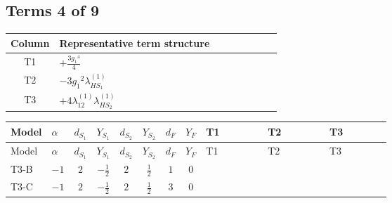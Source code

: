 \documentclass[8pt]{article}
\begin{document}
\begin{landscape}
\subsection*{Terms 4 of 9}
\begin{center}
\begin{tabular}{@{}c >{\raggedright\arraybackslash}p{0.82\linewidth}@{}}
\toprule
Column & Representative term structure \\
\midrule
T1 & \(\displaystyle +\frac{3 {g_1}^4}{4}\) \\
\midrule
T2 & \(\displaystyle -3 {g_1}^2 {\lambda_{HS_1}^{(1)}}\) \\
\midrule
T3 & \(\displaystyle +4 {\lambda_{12}^{(1)}} {\lambda_{HS_2}^{(1)}}\) \\
\midrule
\bottomrule
\end{tabular}
\end{center}
\smallskip
\tiny
\begin{longtable}{@{}llcccccc >{\raggedright\arraybackslash}p{0.21\linewidth} >{\raggedright\arraybackslash}p{0.21\linewidth} >{\raggedright\arraybackslash}p{0.21\linewidth}@{}}
\toprule
Model & $\alpha$ & $d_{S_1}$ & $Y_{S_1}$ & $d_{S_2}$ & $Y_{S_2}$ & $d_F$ & $Y_F$ & T1 & T2 & T3 \\
\midrule
\endfirsthead
\toprule
Model & $\alpha$ & $d_{S_1}$ & $Y_{S_1}$ & $d_{S_2}$ & $Y_{S_2}$ & $d_F$ & $Y_F$ & T1 & T2 & T3 \\
\midrule
\endhead
T3-B & $-1$ & $2$ & $-\frac{1}{2}$ & $2$ & $\frac{1}{2}$ & $1$ & $0$ & \scriptsize\adjustbox{max width=\linewidth}{$\begin{gathered} +\frac{3 {g_1}^4}{4}\end{gathered}$} & \scriptsize\adjustbox{max width=\linewidth}{$\begin{gathered} -3 {g_1}^2 {\lambda_{HS_1}^{(1)}}\end{gathered}$} & \scriptsize\adjustbox{max width=\linewidth}{$\begin{gathered} +4 {\lambda_{12}^{(1)}} {\lambda_{HS_2}^{(1)}}\end{gathered}$} \\
\midrule
T3-C & $-1$ & $2$ & $-\frac{1}{2}$ & $2$ & $\frac{1}{2}$ & $3$ & $0$ & \scriptsize\adjustbox{max width=\linewidth}{$\begin{gathered} +\frac{3 {g_1}^4}{4}\end{gathered}$} & \scriptsize\adjustbox{max width=\linewidth}{$\begin{gathered} -3 {g_1}^2 {\lambda_{HS_1}^{(1)}}\end{gathered}$} & \scriptsize\adjustbox{max width=\linewidth}{$\begin{gathered} +4 {\lambda_{12}^{(1)}} {\lambda_{HS_2}^{(1)}}\end{gathered}$} \\

\end{longtable}
\end{landscape}
\end{document}
